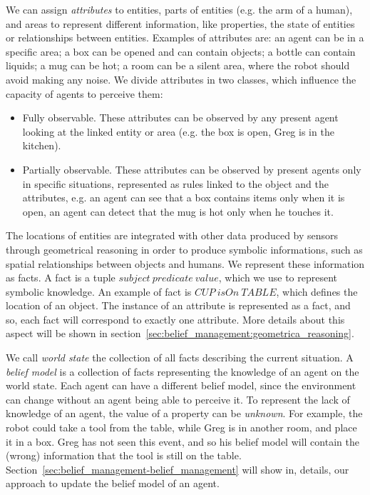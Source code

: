 We can assign \textit{attributes} to entities, parts of entities (e.g. the arm of a human), and areas to represent different information, like properties, the state of entities or relationships between entities. Examples of attributes are:
an agent can be in a specific area; a box can be opened and can contain objects; a bottle can contain liquids; a mug can be hot; a room can be a silent area, where the robot should avoid making any noise.
We divide attributes in two classes, which influence the capacity of agents to perceive them: 
\begin{itemize}
\item Fully observable. These attributes can be observed by any present agent looking at the linked entity or area (e.g. the box is open, Greg is in the kitchen).
\item Partially observable. These attributes can be observed by present agents only in specific situations, represented as rules linked to the object and the attributes, e.g. an agent can see that a box contains items only when it is open, an agent can detect that the mug is hot only when he touches it. 
\end{itemize}

The locations of entities are integrated with other data produced by sensors through geometrical reasoning in order to produce symbolic informations, such as spatial relationships between objects and humans. We represent these information as facts. A fact is a tuple $subject\> predicate\> value$, which we use to represent symbolic knowledge. An example of fact is $CUP\> isOn\> TABLE$, which defines the location of an object. The instance of an attribute is represented as a fact, and so, each fact will correspond to exactly one attribute. More details about this aspect will be shown in section~\ref{sec:belief_management:geometrica_reasoning}.

We call \textit{world state} the collection of all facts describing the current situation. A \textit{belief model} is a collection of facts representing the knowledge of an agent on the world state. Each agent can have a different belief model, since the environment can change without an agent being able to perceive it. To represent the lack of knowledge of an agent, the value of a property can be \textit{unknown}. For example, the robot could take a tool from the table, while Greg is in another room, and place it in a box. Greg has not seen this event, and so his belief model will contain the (wrong) information that the tool is still on the table.  Section~\ref{sec:belief_management-belief_management} will show in, details, our approach to update the belief model of an agent.

